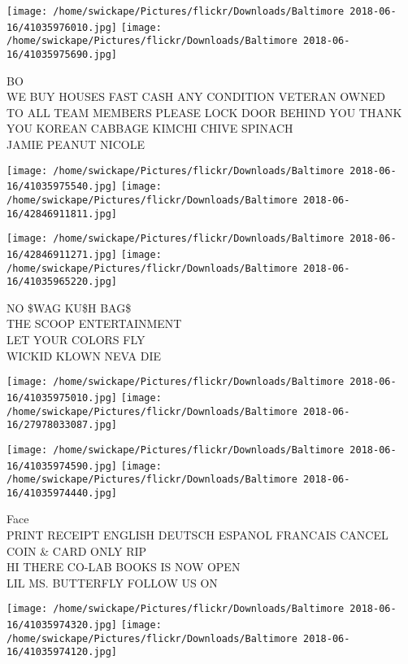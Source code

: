 \documentclass[10pt,letterpaper]{article}
\begin{document}
\texttt{[image: /home/swickape/Pictures/flickr/Downloads/Baltimore 2018-06-16/41035976010.jpg]}
\texttt{[image: /home/swickape/Pictures/flickr/Downloads/Baltimore 2018-06-16/41035975690.jpg]}

BO\\
WE BUY HOUSES FAST CASH ANY CONDITION VETERAN OWNED\\
TO ALL TEAM MEMBERS PLEASE LOCK DOOR BEHIND YOU THANK YOU KOREAN CABBAGE KIMCHI CHIVE SPINACH\\
JAMIE PEANUT NICOLE\\
\pagebreak

\texttt{[image: /home/swickape/Pictures/flickr/Downloads/Baltimore 2018-06-16/41035975540.jpg]}
\texttt{[image: /home/swickape/Pictures/flickr/Downloads/Baltimore 2018-06-16/42846911811.jpg]}

\texttt{[image: /home/swickape/Pictures/flickr/Downloads/Baltimore 2018-06-16/42846911271.jpg]}
\texttt{[image: /home/swickape/Pictures/flickr/Downloads/Baltimore 2018-06-16/41035965220.jpg]}

NO \$WAG KU\$H BAG\$\\
THE SCOOP ENTERTAINMENT\\
LET YOUR COLORS FLY\\
WICKID KLOWN NEVA DIE\\
\pagebreak

\texttt{[image: /home/swickape/Pictures/flickr/Downloads/Baltimore 2018-06-16/41035975010.jpg]}
\texttt{[image: /home/swickape/Pictures/flickr/Downloads/Baltimore 2018-06-16/27978033087.jpg]}

\texttt{[image: /home/swickape/Pictures/flickr/Downloads/Baltimore 2018-06-16/41035974590.jpg]}
\texttt{[image: /home/swickape/Pictures/flickr/Downloads/Baltimore 2018-06-16/41035974440.jpg]}

Face\\
PRINT RECEIPT ENGLISH DEUTSCH ESPANOL FRANCAIS CANCEL COIN \& CARD ONLY RIP\\
HI THERE CO{-}LAB BOOKS IS NOW OPEN\\
LIL MS. BUTTERFLY FOLLOW US ON\\
\pagebreak

\texttt{[image: /home/swickape/Pictures/flickr/Downloads/Baltimore 2018-06-16/41035974320.jpg]}
\texttt{[image: /home/swickape/Pictures/flickr/Downloads/Baltimore 2018-06-16/41035974120.jpg]}
\end{document}

